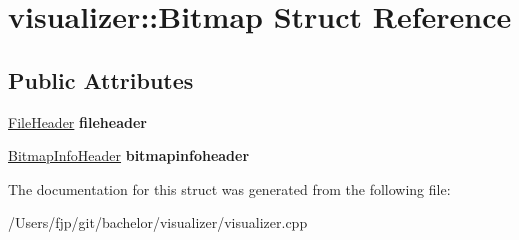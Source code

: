 \hypertarget{structvisualizer_1_1_bitmap}{}\section{visualizer\+:\+:Bitmap Struct Reference}
\label{structvisualizer_1_1_bitmap}
\subsection*{Public Attributes}
\begin{DoxyCompactItemize}
\item 
\mbox{\label{structvisualizer_1_1_bitmap_a35cd50ab96ca92a2f3cc92fbec0ccef0}} 
\mbox{\hyperlink{structvisualizer_1_1_file_header}{File\+Header}} {\bfseries fileheader}
\item 
\mbox{\label{structvisualizer_1_1_bitmap_ae321d14404bf8daff08333b6b2858603}} 
\mbox{\hyperlink{structvisualizer_1_1_bitmap_info_header}{Bitmap\+Info\+Header}} {\bfseries bitmapinfoheader}
\end{DoxyCompactItemize}


The documentation for this struct was generated from the following file\+:\begin{DoxyCompactItemize}
\item 
/\+Users/fjp/git/bachelor/visualizer/visualizer.\+cpp\end{DoxyCompactItemize}
